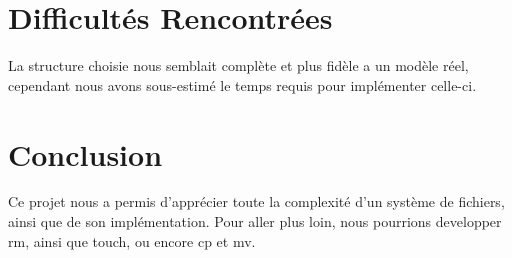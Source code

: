 \documentclass{report}
\begin{document}
\section*{Difficultés Rencontrées}
La structure choisie nous semblait complète et plus fidèle a un modèle réel, cependant nous avons sous-estimé le temps requis pour implémenter celle-ci.
\section*{Conclusion}
Ce projet nous a permis d'apprécier toute la complexité d'un système de fichiers, ainsi que de son implémentation. Pour aller plus loin, nous pourrions developper rm, ainsi que touch, ou encore cp et mv.
\end{document}
